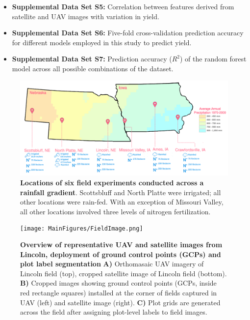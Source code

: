 \documentclass[12pt,twoside]{gsag3jnl}
\begin{document}
\begin{itemize}
\item \textbf{Supplemental Data Set S5:} Correlation between features derived from satellite and UAV images with variation in yield.
\item \textbf{Supplemental Data Set S6:} Five-fold cross-validation prediction accuracy for different models employed in this study to predict yield.
\item \textbf{Supplemental Data Set S7:} Prediction accuracy ($R^2$) of the random forest model across all possible combinations of the dataset.
\\
\end{itemize}



\newpage

\begin{figure}[h]
    \centering
    \includegraphics[width=1\linewidth]{MainFigures/Map.png}
    \caption{\textbf{Locations of six field experiments conducted across a rainfall gradient}. Scottsbluff and North Platte were irrigated; all other locations were rain-fed. With an exception of Missouri Valley, all other locations involved three levels of nitrogen fertilization.}
    \label{fig:locationoversview}
\end{figure}

\begin{figure}[h]
    \centering
    \texttt{[image: MainFigures/FieldImage.png]}
    \caption{\textbf{Overview of representative UAV and satellite images from Lincoln, deployment of ground control points (GCPs) and plot label segmentation} \textbf{A)} Orthomasaic UAV imagery of Lincoln field (top), cropped satellite image of Lincoln field (bottom). \textbf{B)} Cropped images showing ground control points (GCPs, inside red rectangle squares) installed at the corner of fields captured in UAV (left) and satellite image (right). \textbf{C)} Plot grids are generated across the field after assigning plot-level labels to field images.}
    \label{fig:plotsegment}
\end{figure}
\end{document}
